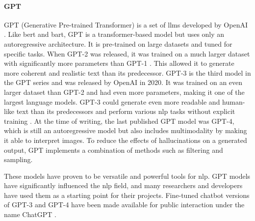     \paragraph{GPT\\}
    GPT (Generative Pre-trained Transformer) is a set of \glspl{llm} developed by OpenAI \cite{radfordImprovingLanguageUnderstanding2018}. Like \gls{bert} and \gls{bart}, GPT is a transformer-based model but uses only an autoregressive architecture. It is pre-trained on large datasets and tuned for specific tasks. When GPT-2 was released, it was trained on a much larger dataset with significantly more parameters than GPT-1 \cite{radfordLanguageModelsAre2019}. This allowed it to generate more coherent and realistic text than its predecessor. GPT-3 is the third model in the GPT series and was released by OpenAI in 2020. It was trained on an even larger dataset than GPT-2 and had even more parameters, making it one of the largest language models. GPT-3 could generate even more readable and human-like text than its predecessors and perform various \gls{nlp} tasks without explicit training \cite{brownLanguageModelsAre2020}. At the time of writing, the last published GPT model was GPT-4, which is still an autoregressive model but also includes multimodality \cite{openaiGPT4TechnicalReport2023} by making it able to interpret images. To reduce the effects of hallucinations on a generated output, GPT implements a combination of methods such as filtering and sampling.
    
    These models have proven to be versatile and powerful tools for \gls{nlp}. GPT models have significantly influenced the \gls{nlp} field, and many researchers and developers have used them as a starting point for their projects. Fine-tuned chatbot versions of GPT-3 and GPT-4 have been made available for public interaction under the name ChatGPT \cite{ChatGPT}.

    
    
